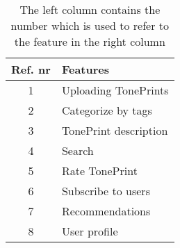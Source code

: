 \begin{table}[H]
	\centering
\begin{tabular}[width=\textwidth]{c|l}
\textbf{Ref. nr} & \textbf{Features} \\ \hline
1 & Uploading TonePrints \\ \hline
2 & Categorize by tags \\ \hline
3 & TonePrint description \\ \hline
4 & Search \\ \hline
5 & Rate TonePrint \\ \hline
6 & Subscribe to users \\ \hline
7 & Recommendations \\ \hline
8 & User profile \\ \hline
\end{tabular}
\caption{The left column contains the number which is used to refer to the feature in the right column}
\label{tab:ListOfCommunityFeatures}
\end{table}

